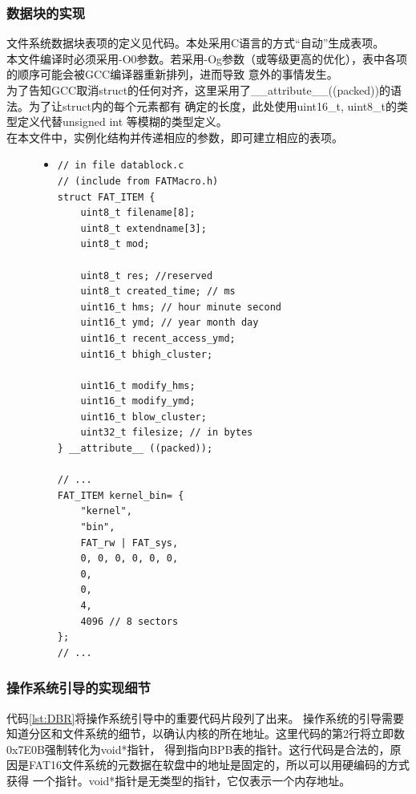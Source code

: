 \documentclass[a4paper]{article}
\begin{document}
    \subsubsection{数据块的实现}
    文件系统数据块表项的定义见代码\label{lst:datablock}。本处采用C语言的方式``自动''生成表项。\\
    
    本文件编译时必须采用-O0参数。若采用-Og参数（或等级更高的优化），表中各项的顺序可能会被GCC编译器重新排列，进而导致
    意外的事情发生。\\
    
    为了告知GCC取消struct的任何对齐，这里采用了\_\_attribute\_\_((packed))的语法。为了让struct内的每个元素都有
    确定的长度，此处使用uint16\_t, uint8\_t的类型定义代替unsigned int 等模糊的类型定义。\\
    
    在本文件中，实例化结构并传递相应的参数，即可建立相应的表项。

\begin{figure}[!htb]
\begin{itemize}
\item[] \begin{lstlisting}[style=mystyle, label=lst:datablock, caption=FAT文件系统数据块项的定义]
// in file datablock.c 
// (include from FATMacro.h)
struct FAT_ITEM {
    uint8_t filename[8];
    uint8_t extendname[3];
    uint8_t mod;
    
    uint8_t res; //reserved
    uint8_t created_time; // ms
    uint16_t hms; // hour minute second
    uint16_t ymd; // year month day
    uint16_t recent_access_ymd;
    uint16_t bhigh_cluster;

    uint16_t modify_hms;
    uint16_t modify_ymd;
    uint16_t blow_cluster;
    uint32_t filesize; // in bytes
} __attribute__ ((packed));

// ...
FAT_ITEM kernel_bin= {
    "kernel",
    "bin",
    FAT_rw | FAT_sys,
    0, 0, 0, 0, 0, 0,
    0,
    0,
    4,
    4096 // 8 sectors
};
// ...
\end{lstlisting}
\end{itemize}
\end{figure}

    \subsubsection{操作系统引导的实现细节}
    代码\ref{lst:DBR}将操作系统引导中的重要代码片段列了出来。
    操作系统的引导需要知道分区和文件系统的细节，以确认内核的所在地址。这里代码的第2行将立即数0x7E0B强制转化为void*指针，
    得到指向BPB表的指针。这行代码是合法的，原因是FAT16文件系统的元数据在软盘中的地址是固定的，所以可以用硬编码的方式获得
    一个指针。void*指针是无类型的指针，它仅表示一个内存地址。 \\
    
\end{document}
